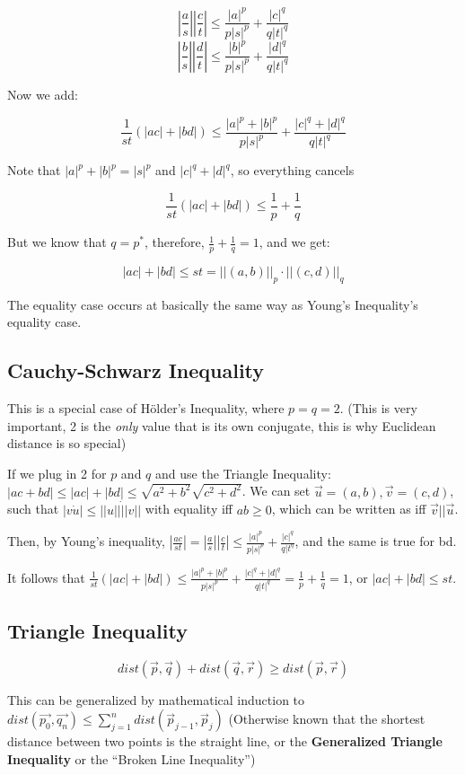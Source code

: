 \documentclass[11 pt, twoside]{article}
\begin{document}
$$|\frac{a}{s}||\frac{c}{t}| \leq \frac{|a|^p}{p|s|^p} + \frac{|c|^q}{q|t|^q}$$
$$|\frac{b}{s}||\frac{d}{t}| \leq \frac{|b|^p}{p|s|^p} + \frac{|d|^q}{q|t|^q}$$

Now we add:

$$\frac{1}{st}(|ac| + |bd|) \leq \frac{|a|^p + |b|^p}{p|s|^p} + \frac{|c|^q +
|d|^q}{q|t|^q}$$

Note that $|a|^p + |b|^p = |s|^p$ and $|c|^q + |d|^q$, so everything cancels

$$\frac{1}{st}(|ac| + |bd|) \leq \frac{1}{p} + \frac{1}{q}$$

But we know that $q = p^*$, therefore, $\frac{1}{p} + \frac{1}{q} = 1$, and we
get:

$$|ac| + |bd| \leq st = ||(a, b)||_p \cdot ||(c, d)||_q$$

The equality case occurs at basically the same way as Young's Inequality's
equality case.


\subsection{Cauchy-Schwarz Inequality}
This is a special case of H\"{o}lder's Inequality, where $p = q = 2$. (This is very important, 2 is the \textit{only} value that is its own conjugate, this is why Euclidean distance is so special)

If we plug in 2 for $p$ and $q$ and use the Triangle Inequality:
$|ac + bd| \leq |ac| + |bd| \leq \sqrt{a^2 + b^2} \sqrt{c^2 + d^2}$. We can set $\vec{u} = (a, b), \vec{v} = (c, d)$, such that $|v \dot u| \leq ||u|| \dot ||v||$ with equality iff $ab \geq 0$, which can be written as iff $\vec{v} || \vec{u}$.

Then, by Young's inequality, $|\frac{ac}{st}| = |\frac{a}{s}||\frac{c}{t}| \leq \frac{|a|^p}{p|s|^p} + \frac{|c|^q}{q|t^q}$, and the same is true for bd.

It follows that $\frac{1}{st}(|ac| + |bd|) \leq \frac{|a|^p + |b|^p}{p|s|^p} + \frac{|c|^q + |d|^q}{q|t|^q} = \frac{1}{p} + \frac{1}{q} = 1$, or $|ac| + |bd| \leq st$.

\subsection{Triangle Inequality}
$$dist(\vec{p}, \vec{q}) + dist(\vec{q}, \vec{r}) \geq dist(\vec{p}, \vec{r})$$

This can be generalized by mathematical induction to $dist(\vec{p_0}, \vec{q_n})
\leq \sum_{j = 1}^n dist(\vec{p}_{j - 1}, \vec{p}_{j})$ (Otherwise known that the
shortest distance between two points is the straight line, or the \textbf{Generalized
Triangle Inequality} or the ``Broken Line Inequality'')
\end{document}
